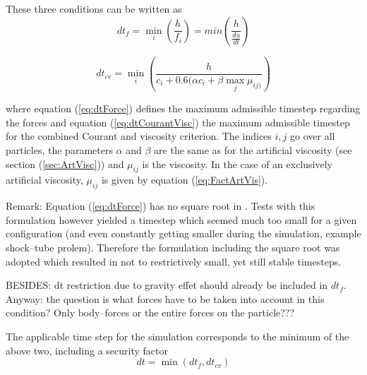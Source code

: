 \documentclass{report}
\begin{document}
These three conditions can be written as \cite{Monaghan1989,Monaghan1992}
\begin{equation}
\label{eq:dtForce}
 dt_f=\min_i\left(\frac{h}{f_i}\right)=min\left(\frac{h}{\frac{du}{dt}}\right)
\end{equation}

\begin{equation}
\label{eq:dtCourantVisc}
 dt_{cv}=\min_i\left(\frac{h}{c_i+0.6(\alpha c_i+\beta \max_j \mu_{ij)}}\right)
\end{equation}

where equation (\ref{eq:dtForce}) defines the maximum admissible timestep regarding the forces and equation (\ref{eq:dtCourantVisc}) the maximum admissible timestep for the combined Courant and viscosity criterion. The indices $i,j$ go over all particles, the parameters $\alpha$ and $\beta$ are the same as for the artificial viscosity (see section (\ref{sec:ArtVisc})) and $\mu_{ij}$ is the viscosity. In the case of an exclusively artificial viscosity, $\mu_{ij}$ is given by equation (\ref{eq:FactArtVis}).

Remark: Equation (\ref{eq:dtForce}) has no square root in \cite{Monaghan1992}. Tests with this formulation however yielded a timestep which seemed much too small for a given configuration (and even constantly getting smaller during the simulation, example shock--tube prolem). Therefore the formulation including the square root \cite{Monaghan1989} was adopted which resulted in not to restrictively small, yet still stable timesteps.

BESIDES: dt restriction due to gravity effet should already be included in $dt_f$. Anyway: the question is what forces have to be taken into account in this condition? Only body--forces or the entire forces on the particle???

The applicable time step for the simulation corresponds to the minimum of the above two, including a security factor 
\begin{equation}
\label{eq:dt}
dt=\min(dt_f,dt_{cv})
\end{equation}
\end{document}
